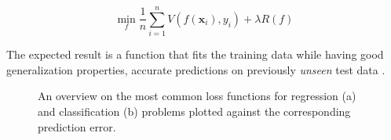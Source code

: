      \begin{equation}\label{eq:losspen}
    	\min_f \frac{1}{n}\sum_{i=1}^n V(f(\bm{x}_i),y_i) + \lambda R(f)
    \end{equation}
    
    
    The expected result is a function that fits the training data while having good generalization properties, \ie accurate predictions on previously  \textit{unseen} test data \cite{hastie2009elements}. 
        
    
%    

    
    \begin{figure}[!ht]
        \centering
        \caption{An overview on the most common loss functions for regression (a) and classification (b) problems plotted against the corresponding prediction error.}\label{fig:loss}
    \end{figure}


